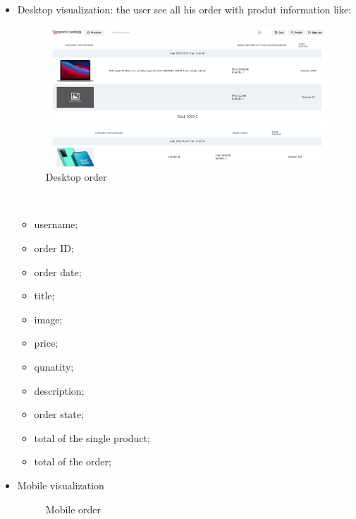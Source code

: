 \begin{itemize}
    \item Desktop visualization:
          the user see all his order with produt information like:
          \begin{figure}[!ht]
              \caption{Desktop order}
              \vspace{10px}
              \includegraphics[scale=0.2]{../../../../Images/userManual/orderDesktop.png}
              \centering
          \end{figure}
          \\
          \begin{itemize}
              \item username;
              \item order ID;
              \item order date;
              \item title;
              \item image;
              \item price;
              \item qunatity;
              \item description;
              \item order state;
              \item total of the single product;
              \item total of the order;
          \end{itemize}
          \newpage
    \item Mobile visualization
          \begin{figure}[!ht]
              \caption{Mobile order}
              \vspace{10px}

\end{figure}
\end{itemize}
